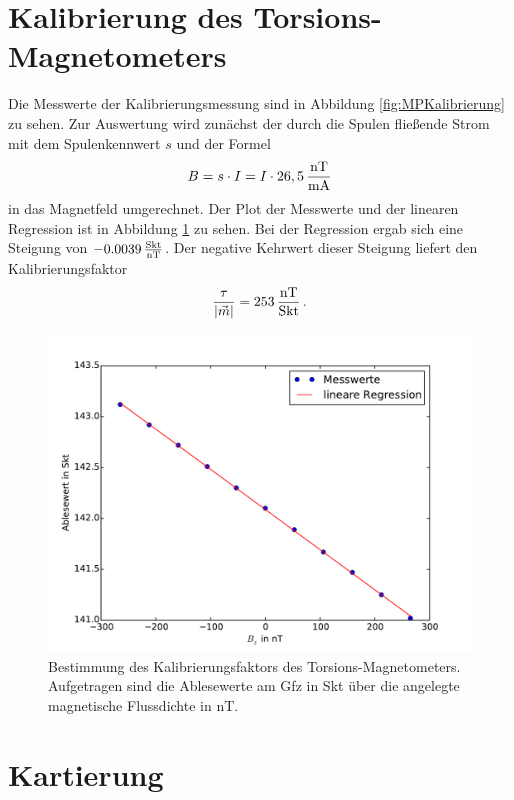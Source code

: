 \section{Kalibrierung des Torsions-Magnetometers}

Die Messwerte der Kalibrierungsmessung sind in Abbildung \ref{fig:MPKalibrierung} zu sehen. Zur Auswertung wird zunächst der durch die Spulen fließende Strom mit dem Spulenkennwert $s$ und der Formel
\begin{equation}
 B=s\cdot I=I\cdot 26,5\,\frac{\mathrm{nT}}{\mathrm{mA}} 
\end{equation}
in das Magnetfeld umgerechnet. Der Plot der Messwerte und der linearen Regression ist in Abbildung \ref{fig:kalibrierung} zu sehen. Bei der Regression ergab sich eine Steigung von $-0.0039\,\frac{\mathrm{Skt}}{\mathrm{nT}}$. Der negative Kehrwert dieser Steigung liefert den Kalibrierungsfaktor
\begin{equation}
 \frac{\tau}{|\vec{m}|}=253\,\frac{\mathrm{nT}}{\mathrm{Skt}} \text{\,.}
\end{equation}

\begin{figure}[!ht]
 \centering
 \includegraphics[width=\textwidth]{fig/kalibrierung.pdf}
 \caption[Bestimmung des Kalibrierungsfaktors des Torsions-Magnetometers]{Bestimmung des Kalibrierungsfaktors des Torsions-Magnetometers. Aufgetragen sind die Ablesewerte am Gfz in Skt über die angelegte magnetische Flussdichte in nT.}
 \label{fig:kalibrierung}
\end{figure}

\section{Kartierung}

